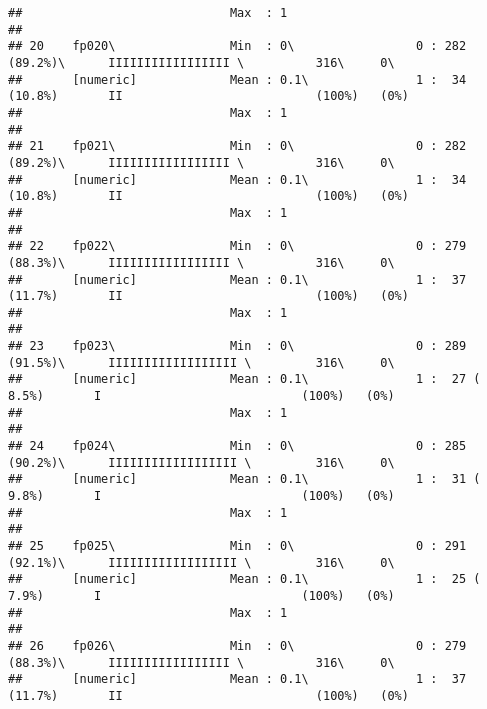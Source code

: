 \documentclass[]{article}
\begin{document}
\begin{verbatim}
##                             Max  : 1                                                                                       
## 
## 20    fp020\                Min  : 0\                 0 : 282 (89.2%)\      IIIIIIIIIIIIIIIII \          316\     0\       
##       [numeric]             Mean : 0.1\               1 :  34 (10.8%)       II                           (100%)   (0%)     
##                             Max  : 1                                                                                       
## 
## 21    fp021\                Min  : 0\                 0 : 282 (89.2%)\      IIIIIIIIIIIIIIIII \          316\     0\       
##       [numeric]             Mean : 0.1\               1 :  34 (10.8%)       II                           (100%)   (0%)     
##                             Max  : 1                                                                                       
## 
## 22    fp022\                Min  : 0\                 0 : 279 (88.3%)\      IIIIIIIIIIIIIIIII \          316\     0\       
##       [numeric]             Mean : 0.1\               1 :  37 (11.7%)       II                           (100%)   (0%)     
##                             Max  : 1                                                                                       
## 
## 23    fp023\                Min  : 0\                 0 : 289 (91.5%)\      IIIIIIIIIIIIIIIIII \         316\     0\       
##       [numeric]             Mean : 0.1\               1 :  27 ( 8.5%)       I                            (100%)   (0%)     
##                             Max  : 1                                                                                       
## 
## 24    fp024\                Min  : 0\                 0 : 285 (90.2%)\      IIIIIIIIIIIIIIIIII \         316\     0\       
##       [numeric]             Mean : 0.1\               1 :  31 ( 9.8%)       I                            (100%)   (0%)     
##                             Max  : 1                                                                                       
## 
## 25    fp025\                Min  : 0\                 0 : 291 (92.1%)\      IIIIIIIIIIIIIIIIII \         316\     0\       
##       [numeric]             Mean : 0.1\               1 :  25 ( 7.9%)       I                            (100%)   (0%)     
##                             Max  : 1                                                                                       
## 
## 26    fp026\                Min  : 0\                 0 : 279 (88.3%)\      IIIIIIIIIIIIIIIII \          316\     0\       
##       [numeric]             Mean : 0.1\               1 :  37 (11.7%)       II                           (100%)   (0%)     

\end{verbatim}
\end{document}

